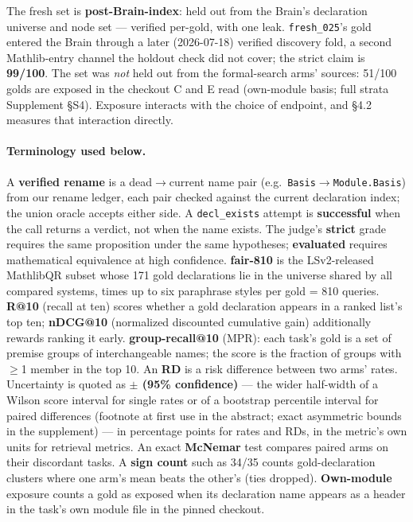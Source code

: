 \documentclass[10pt]{article}
\newcommand{\code}[1]{\texttt{#1}}
\newcommand{\Ssec}[1]{Supplement \S #1}
\begin{document}
The fresh set is \textbf{post-Brain-index}: held out from the Brain's
declaration universe and node set --- verified per-gold, with one leak.
\code{fresh\_025}'s gold entered the Brain through a later (2026-07-18)
verified discovery fold, a second Mathlib-entry channel the holdout
check did not cover; the strict claim is \textbf{99/100}. The set was
\emph{not} held out from the formal-search arms' sources: 51/100 golds
are exposed in the checkout C and E read (own-module basis; full strata
\Ssec{S4}). Exposure interacts with the choice of endpoint, and \S 4.2
measures that interaction directly.

\paragraph{Terminology used below.} A \textbf{verified rename} is a
dead$\to$current name pair (e.g.\ \code{Basis}$\to$\code{Module.Basis})
from our rename ledger, each pair checked against the current
declaration index; the union oracle accepts either side. A
\code{decl\_exists} attempt is \textbf{successful} when the call returns
a verdict, not when the name exists. The judge's \textbf{strict} grade
requires the same proposition under the same hypotheses;
\textbf{evaluated} requires mathematical equivalence at high confidence.
\textbf{fair-810} is the LSv2-released MathlibQR subset whose 171 gold
declarations lie in the universe shared by all compared systems, times
up to six paraphrase styles per gold = 810 queries. \textbf{R@10}
(recall at ten) scores whether a gold declaration appears in a ranked
list's top ten; \textbf{nDCG@10} (normalized discounted cumulative gain)
additionally rewards ranking it early. \textbf{group-recall@10} (MPR):
each task's gold is a set of premise groups of interchangeable names;
the score is the fraction of groups with $\geq$1 member in the top 10.
An \textbf{RD} is a risk difference between two arms' rates.
Uncertainty is quoted as \textbf{$\pm$ (95\% confidence)} --- the
wider half-width of a Wilson score interval for single rates or of a
bootstrap percentile interval for paired differences (footnote at
first use in the abstract; exact asymmetric bounds in the supplement)
--- in percentage points for rates and RDs, in the metric's own units
for retrieval metrics. An exact \textbf{McNemar} test compares paired
arms on their discordant tasks. A \textbf{sign count} such as 34/35 counts
gold-declaration clusters where one arm's mean beats the other's (ties
dropped). \textbf{Own-module} exposure counts a gold as exposed when its
declaration name appears as a header in the task's own module file in
the pinned checkout.
\end{document}
